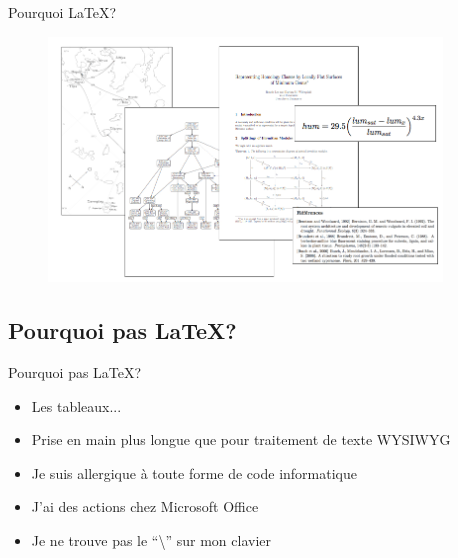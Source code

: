 \documentclass[10pt,svgnames,usenames,table]{beamer} %
\begin{document}
\begin{frame}{Pourquoi \LaTeX{}?}

\begin{figure}[htbp]
\begin{center}
\includegraphics[height=6.5cm]{latex_exemples}
\end{center}
\end{figure}
\end{frame}

\subsection{Pourquoi pas \LaTeX{}?}
\begin{frame}{Pourquoi pas \LaTeX{}?}

  \begin{itemize}
  	\item Les tableaux...
	\item Prise en main plus longue que pour traitement de texte WYSIWYG
	\item Je suis allergique à toute forme de code informatique
	\item J'ai des actions chez Microsoft Office
	\item Je ne trouve pas le ``\textbackslash'' sur mon clavier
  \end{itemize}
\end{frame}

\end{document}
